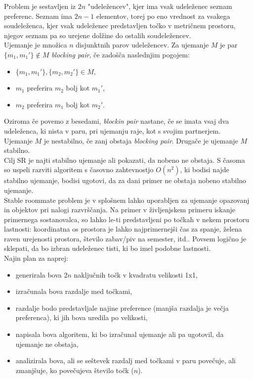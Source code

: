 \documentclass[12pt, a4paper]{article}
\begin{document}
 Problem je sestavljen iz $2n$ "udeležencev", kjer ima vsak udeleženec seznam preferenc. Seznam ima $2n - 1$ elementov, torej po eno vrednost za vsakega soudeleženca, kjer vsak udeleženec predstavljen točko v metričnem prostoru, njegov seznam pa so urejene dolžine do ostalih soudeležencev.\\
Ujemanje je množica $n$ disjunktnih parov udeležencev.
Za ujemanje $M$ je par $\{m_{1}, m_{1}' \} \notin M$ \textit{blocking pair}, če zadošča naslednjim pogojem:
\begin{itemize}
	\item  $\{m_{1}, m_{1}' \}, \{m_{2}, m_{2}' \} \in M$,
	\item $m_1$ preferira $m_2$ bolj kot $m_1'$,
	\item $m_2$ preferira $m_1$ bolj kot $m_2'$.
\end{itemize}
Oziroma če povemo z besedami, \textit{blockin pair} nastane, če se imata vsaj dva udeleženca, ki nista v paru, pri ujemanju raje, kot s svojim partnerjem. \\

Ujemanje $M$ je nestabilno, če zanj obstaja \textit{blocking pair}. Drugače je ujemanje $M$ stabilno.\\
Cilj SR je najti stabilno ujemanje ali pokazati, da nobeno ne obstaja. S časoma so uspeli razviti algoritem s časovno zahtevnostjo $O(n^2)$, ki bodisi najde stabilno ujemanje, bodisi ugotovi, da za dani primer ne obstaja nobeno stabilno ujemanje.\\

Stable roommate problem je v splošnem lahko uporabljen za ujemanje opazovanj in objektov pri nalogi razvrščanja. Na primer v življenjskem primeru iskanje primernega sostanovalca, so lahko le-ti predstavljeni po točkah v nekem prostoru lastnosti: koordinatna os prostora je lahko najprimernejši čas za spanje, želena raven urejenosti prostora, število zabav/piv na semester, itd.. Povsem logično je sklepati, da bo izbran udeleženec tisti, ki bo imel podobne lastnosti. \\

\pagebreak
Najin plan za naprej:
\begin{itemize}
	\item generirala bova $2n$ naključnih točk v kvadratu velikosti 1x1,
	\item izračunala bova razdalje med točkami,
	\item razdalje bodo predstavljale najine preference (manjša razdalja je večja preferenca), ki jih bova uredila po velikosti,
	\item napisala bova algoritem, ki bo izračunal ujemanje ali pa ugotovil, da ujemanje ne obstaja,
	\item analizirala bova, ali se seštevek razdalj med točkami v paru povečuje, ali zmanjšuje, ko povečujeva število točk ($n$).
\end{itemize}
\end{document}
